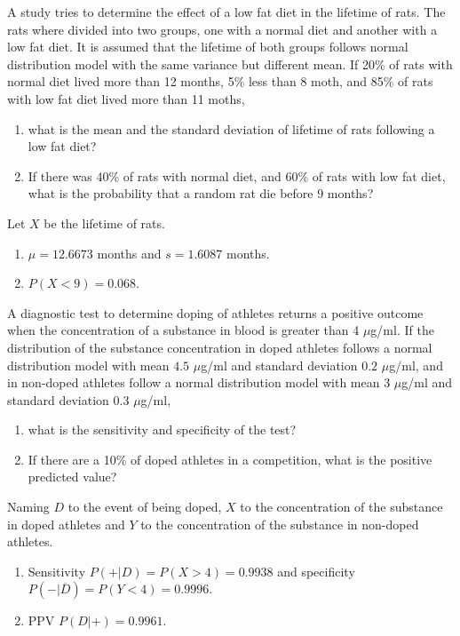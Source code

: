 {A study tries to determine the effect of a low fat diet in the lifetime of rats.
The rats where divided into two groups, one with a normal diet and another with a low fat diet.
It is assumed that the lifetime of both groups follows normal distribution model with the same variance but different
mean.
If 20\% of rats with normal diet lived more than 12 months, 5\% less than 8 moth, and 85\% of rats with low fat diet
lived more than 11 moths,
\begin{enumerate}
\item what is the mean and the standard deviation of lifetime of rats following a low fat diet?
\item If there was 40\% of rats with normal diet, and 60\% of rats with low fat diet, what is the probability that a
random rat die before 9 months?
\end{enumerate}
}
{Let $X$ be the lifetime of rats.
\begin{enumerate}
\item $\mu=12.6673$ months and $s=1.6087$ months.
\item $P(X<9)=0.068$.
\end{enumerate}
}
{}


{A diagnostic test to determine doping of athletes returns a positive outcome when the concentration of a substance
in blood is greater than 4 $\mu$g/ml.
If the distribution of the substance concentration in doped athletes follows a normal distribution model with mean $4.5$
$\mu$g/ml and standard deviation $0.2$ $\mu$g/ml, and in non-doped athletes follow a normal distribution model with mean
$3$ $\mu$g/ml and standard deviation $0.3$ $\mu$g/ml,
\begin{enumerate}
\item what is the sensitivity and specificity of the test?
\item If there are a 10\% of doped athletes in a competition, what is the positive predicted value?
\end{enumerate}
}
{Naming $D$ to the event of being doped, $X$ to the concentration of the substance in doped athletes and $Y$ to the concentration of the substance in non-doped athletes.
\begin{enumerate}
\item Sensitivity $P(+|D)=P(X>4)=0.9938$ and specificity $P(-|\overline D)=P(Y<4)=0.9996$.
\item PPV $P(D|+)=0.9961$.
\end{enumerate}
}
{}
